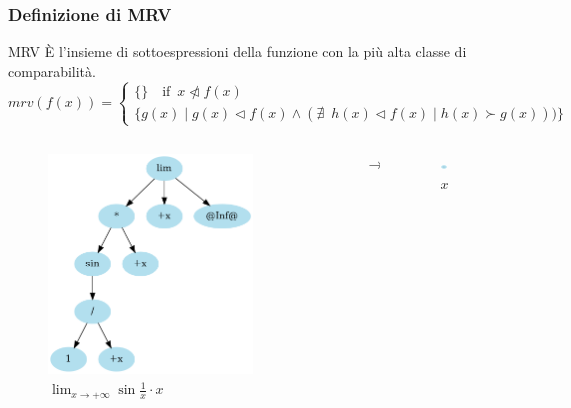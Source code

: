 \documentclass[aspectratio=149]{beamer}
\begin{document}
	\begin{frame}
		\frametitle{Definizione di MRV}
		\begin{block}{MRV}
			È l'insieme di sottoespressioni della funzione con la più alta classe di comparabilità.
			\[
			mrv(f(x)) = \begin{cases}
				\{\} \quad \text{if} \enspace x \ntriangleleft f(x) \\
				\{g(x) \mid g(x) \triangleleft f(x) \wedge (\nexists \enspace h(x) \triangleleft f(x) \mid h(x) \succ g(x)))\}
			\end{cases}
			\]
		\end{block}
	\end{frame}

	\begin{frame}
		\begin{columns}
			\begin{column}{0.45\textwidth}
				\begin{figure}
					\includegraphics[width=0.8\textwidth]{pres_img/prima_semplif.png}
					\caption{\(\lim_{x \to +\infty}{\sin{\frac{1}{x}} \cdot x}\)}
				\end{figure}
			\end{column}
			\begin{column}{0.1\textwidth}
				\begin{center}
					$\rightarrow$
				\end{center}
			\end{column}
			\begin{column}{0.45\textwidth}
				\begin{figure}
					\includegraphics[width=0.2\textwidth]{pres_img/mrv_1.png}
					\caption{\(x\)}
				\end{figure}
			\end{column}
		\end{columns}
	\end{frame}
\end{document}
